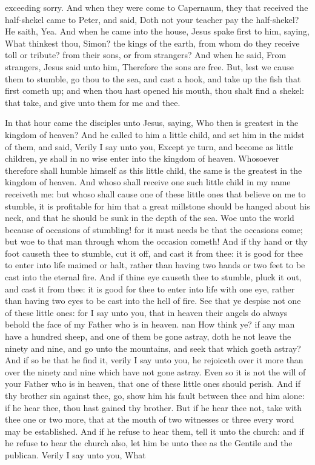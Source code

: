 exceeding sorry.  And when they were come to Capernaum, they that received the half-shekel came to Peter, and said, Doth not your teacher pay the half-shekel? He saith, Yea. And when he came into the house, Jesus spake first to him, saying, What thinkest thou, Simon? the kings of the earth, from whom do they receive toll or tribute? from their sons, or from strangers? And when he said, From strangers, Jesus said unto him, Therefore the sons are free. But, lest we cause them to stumble, go thou to the sea, and cast a hook, and take up the fish that first cometh up; and when thou hast opened his mouth, thou shalt find a shekel: that take, and give unto them for me and thee. 

In that hour came the disciples unto Jesus, saying, Who then is greatest in the kingdom of heaven? And he called to him a little child, and set him in the midst of them, and said, Verily I say unto you, Except ye turn, and become as little children, ye shall in no wise enter into the kingdom of heaven. Whosoever therefore shall humble himself as this little child, the same is the greatest in the kingdom of heaven. And whoso shall receive one such little child in my name receiveth me: but whoso shall cause one of these little ones that believe on me to stumble, it is profitable for him that a great millstone should be hanged about his neck, and that he should be sunk in the depth of the sea.  Woe unto the world because of occasions of stumbling! for it must needs be that the occasions come; but woe to that man through whom the occasion cometh! And if thy hand or thy foot causeth thee to stumble, cut it off, and cast it from thee: it is good for thee to enter into life maimed or halt, rather than having two hands or two feet to be cast into the eternal fire. And if thine eye causeth thee to stumble, pluck it out, and cast it from thee: it is good for thee to enter into life with one eye, rather than having two eyes to be cast into the hell of fire. See that ye despise not one of these little ones: for I say unto you, that in heaven their angels do always behold the face of my Father who is in heaven. nan How think ye? if any man have a hundred sheep, and one of them be gone astray, doth he not leave the ninety and nine, and go unto the mountains, and seek that which goeth astray? And if so be that he find it, verily I say unto you, he rejoiceth over it more than over the ninety and nine which have not gone astray. Even so it is not the will of your Father who is in heaven, that one of these little ones should perish.  And if thy brother sin against thee, go, show him his fault between thee and him alone: if he hear thee, thou hast gained thy brother. But if he hear thee not, take with thee one or two more, that at the mouth of two witnesses or three every word may be established. And if he refuse to hear them, tell it unto the church: and if he refuse to hear the church also, let him be unto thee as the Gentile and the publican. Verily I say unto you, What 